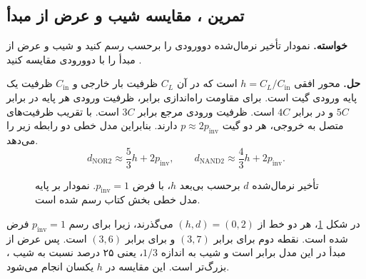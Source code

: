 \subsection{تمرین ، مقایسه شیب و عرض از مبدأ}
\label{sec:delay-exercise-nor-plot}

\textbf{خواسته.}
نمودار تأخیر نرمال‌شده  دوورودی را برحسب
 رسم کنید و شیب و عرض از مبدأ را
با  دوورودی مقایسه کنید
\cite[تمرین  و شکل ،
صفحات ۱۵۵ و ۱۷۷]{weste}.

\textbf{حل.}
محور افقی \(h=C_L/C_{\mathrm{in}}\) است که در آن \(C_L\)
ظرفیت بار خارجی و \(C_{\mathrm{in}}\) ظرفیت یک پایه ورودی
گیت است.
برای مقاومت راه‌اندازی برابر، ظرفیت ورودی هر پایه در
 برابر \(5C\) و در  برابر \(4C\)
است. ظرفیت ورودی  مرجع برابر \(3C\) است.
با تقریب ظرفیت‌های  متصل به خروجی، هر دو
گیت \(p\approx2p_{\mathrm{inv}}\) دارند. بنابراین مدل خطی
دو رابطه زیر را می‌دهد.
\[
  d_{\mathrm{NOR2}}\approx\frac53 h+2p_{\mathrm{inv}},
  \qquad
  d_{\mathrm{NAND2}}\approx\frac43 h+2p_{\mathrm{inv}}.
\]
\begin{figure}[htbp]
  \centering
  \begin{latin}
  \end{latin}
  \caption{تأخیر نرمال‌شده \(d\) برحسب 
  بی‌بعد \(h\)، با فرض \(p_{\mathrm{inv}}=1\).
  نمودار بر پایه مدل خطی بخش  کتاب
  \cite{weste} رسم شده است.}
  \label{fig:delay-gate-comparison}
\end{figure}
در شکل \ref{fig:delay-gate-comparison}، هر دو خط از
\((h,d)=(0,2)\) می‌گذرند، زیرا برای رسم
\(p_{\mathrm{inv}}=1\) فرض شده است. نقطه دوم برای
 برابر \((3,7)\) و برای  برابر
\((3,6)\) است. پس عرض از مبدأ در این مدل برابر است و
شیب  به اندازه \(1/3\)، یعنی ۲۵ درصد نسبت به
شیب ، بزرگ‌تر است. این مقایسه در \(h\) یکسان
انجام می‌شود.
